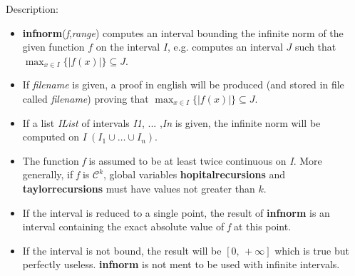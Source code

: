 \noindent Description: \begin{itemize}

\item \textbf{infnorm}(\emph{f},\emph{range}) computes an interval bounding the infinite norm of the 
   given function $f$ on the interval $I$, e.g. computes an interval $J$
   such that $\max_{x \in I} \{|f(x)|\} \subseteq J$.

\item If \emph{filename} is given, a proof in english will be produced (and stored in file
   called \emph{filename}) proving that  $\max_{x \in I} \{|f(x)|\} \subseteq J$.

\item If a list \emph{IList} of intervals \emph{I1}, ... ,\emph{In} is given, the infinite norm will
   be computed on $I \ (I_1 \cup \dots \cup I_n)$.

\item The function \emph{f} is assumed to be at least twice continuous on \emph{I}. More 
   generally, if \emph{f} is $\mathcal{C}^k$, global variables \textbf{hopitalrecursions} and
   \textbf{taylorrecursions} must have values not greater than $k$.  

\item If the interval is reduced to a single point, the result of \textbf{infnorm} is an 
   interval containing the exact absolute value of \emph{f} at this point.

\item If the interval is not bound, the result will be $[0,\,+\infty]$ 
   which is true but perfectly useless. \textbf{infnorm} is not ment to be used with 
   infinite intervals.


\end{itemize}
